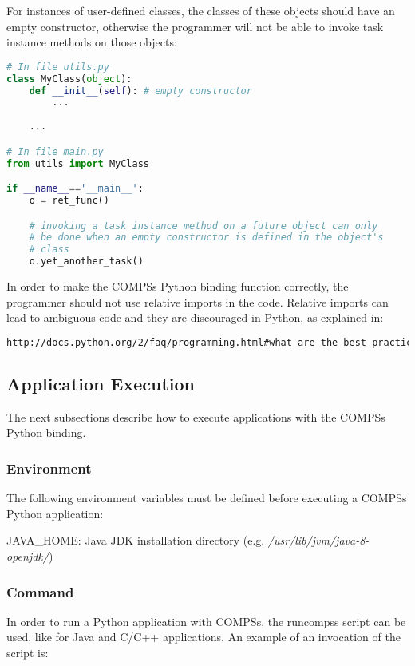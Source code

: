                          
For instances of user-defined classes, the classes of these objects 
should have an empty constructor, otherwise the programmer will not be able to invoke task instance 
methods on those objects:
                                   
\begin{lstlisting}[language=python]
# In file utils.py
class MyClass(object):
    def __init__(self): # empty constructor
        ...
        
    ...

# In file main.py
from utils import MyClass

if __name__=='__main__':
    o = ret_func()

    # invoking a task instance method on a future object can only
    # be done when an empty constructor is defined in the object's
    # class
    o.yet_another_task()
\end{lstlisting}

In order to make the COMPSs Python binding function correctly, the programmer should not use relative imports in the code.
Relative imports can lead to ambiguous code and they are discouraged in Python, as explained in:

\begin{lstlisting}[language=html]
http://docs.python.org/2/faq/programming.html#what-are-the-best-practices-for-using-import-in-a-module
\end{lstlisting}


\subsection{Application Execution}
The next subsections describe how to execute applications with the COMPSs Python binding.

\subsubsection{Environment}
The following environment variables must be defined before executing a COMPSs Python application:

JAVA\_HOME: Java JDK installation directory (e.g. \textit{/usr/lib/jvm/java-8-openjdk/})

\subsubsection{Command}
In order to run a Python application with COMPSs, the runcompss script can be used, like for 
Java and C/C++ applications. An example of an invocation of the script is:

